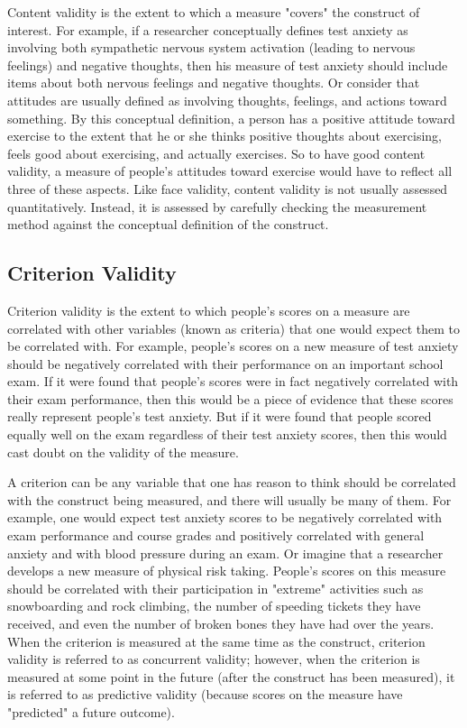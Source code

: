 Content validity is the extent to which a measure "covers" the construct of interest. For example, if a researcher conceptually defines test anxiety as involving both sympathetic nervous system activation (leading to nervous feelings) and negative thoughts, then his measure of test anxiety should include items about both nervous feelings and negative thoughts. Or consider that attitudes are usually defined as involving thoughts, feelings, and actions toward something. By this conceptual definition, a person has a positive attitude toward exercise to the extent that he or she thinks positive thoughts about exercising, feels good about exercising, and actually exercises. So to have good content validity, a measure of people's attitudes toward exercise would have to reflect all three of these aspects. Like face validity, content validity is not usually assessed quantitatively. Instead, it is assessed by carefully checking the measurement method against the conceptual definition of the construct.

\subsection{Criterion Validity}

Criterion validity is the extent to which people's scores on a measure are correlated with other variables (known as criteria) that one would expect them to be correlated with. For example, people's scores on a new measure of test anxiety should be negatively correlated with their performance on an important school exam. If it were found that people's scores were in fact negatively correlated with their exam performance, then this would be a piece of evidence that these scores really represent people's test anxiety. But if it were found that people scored equally well on the exam regardless of their test anxiety scores, then this would cast doubt on the validity of the measure.

A criterion can be any variable that one has reason to think should be correlated with the construct being measured, and there will usually be many of them. For example, one would expect test anxiety scores to be negatively correlated with exam performance and course grades and positively correlated with general anxiety and with blood pressure during an exam. Or imagine that a researcher develops a new measure of physical risk taking. People's scores on this measure should be correlated with their participation in "extreme" activities such as snowboarding and rock climbing, the number of speeding tickets they have received, and even the number of broken bones they have had over the years. When the criterion is measured at the same time as the construct, criterion validity is referred to as concurrent validity; however, when the criterion is measured at some point in the future (after the construct has been measured), it is referred to as predictive validity (because scores on the measure have "predicted" a future outcome).

